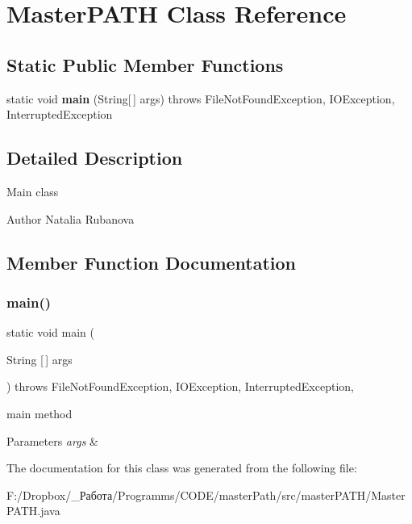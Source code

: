 \section{Master\+P\+A\+TH Class Reference}
\label{classmaster_p_a_t_h_1_1_master_p_a_t_h}
\subsection*{Static Public Member Functions}
\begin{DoxyCompactItemize}
\item 
static void \textbf{ main} (String[$\,$] args)  throws File\+Not\+Found\+Exception, I\+O\+Exception, Interrupted\+Exception 
\end{DoxyCompactItemize}


\subsection{Detailed Description}
Main class

\begin{DoxyAuthor}{Author}
Natalia Rubanova 
\end{DoxyAuthor}


\subsection{Member Function Documentation}
\mbox{\label{classmaster_p_a_t_h_1_1_master_p_a_t_h_a8b260eecbaabcef8473fd87ada040682}} 
\subsubsection{main()}
{\footnotesize\ttfamily static void main (\begin{DoxyParamCaption}\item[{String [$\,$]}]{args }\end{DoxyParamCaption}) throws File\+Not\+Found\+Exception, I\+O\+Exception, Interrupted\+Exception\hspace{0.3cm}{\ttfamily [inline]}, {\ttfamily [static]}}

main method 
\begin{DoxyParams}{Parameters}
{\em args} & \\
\hline
\end{DoxyParams}


The documentation for this class was generated from the following file\+:\begin{DoxyCompactItemize}
\item 
F\+:/\+Dropbox/\+\_\+Работа/\+Programms/\+C\+O\+D\+E/master\+Path/src/master\+P\+A\+T\+H/Master\+P\+A\+T\+H.\+java\end{DoxyCompactItemize}
